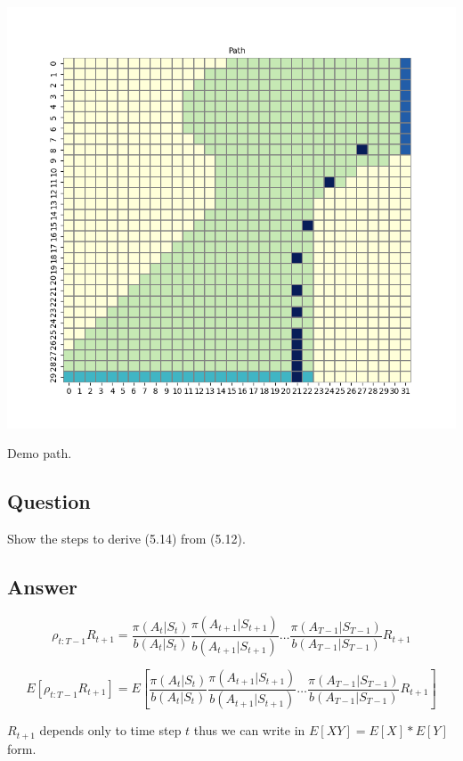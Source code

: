 \documentclass[11pt]{article}
\begin{document}
    \includegraphics[scale=0.7]{env3_demo_e_5_12_21}

    Demo path.

    \subsection{Question}

    Show the steps to derive (5.14) from (5.12).

    \subsection*{Answer}

    \begin{equation}
        \rho_{t:T-1}R_{t+1} = \frac{\pi(A_t|S_t)}{b(A_t|S_t)} \frac{\pi(A_{t+1}|S_{t+1})}{b(A_{t+1}|S_{t+1})} \dots \frac{\pi(A_{T-1}|S_{T-1})}{b(A_{T-1}|S_{T-1})} R_{t+1}
    \end{equation}

    \begin{equation}
        E[\rho_{t:T-1}R_{t+1}] = E[\frac{\pi(A_t|S_t)}{b(A_t|S_t)} \frac{\pi(A_{t+1}|S_{t+1})}{b(A_{t+1}|S_{t+1})} \dots \frac{\pi(A_{T-1}|S_{T-1})}{b(A_{T-1}|S_{T-1})} R_{t+1}]
    \end{equation}

    $R_{t+1}$ depends only to time step $t$ thus we can write in $E[XY] = E[X] * E[Y]$ form.
\end{document}
